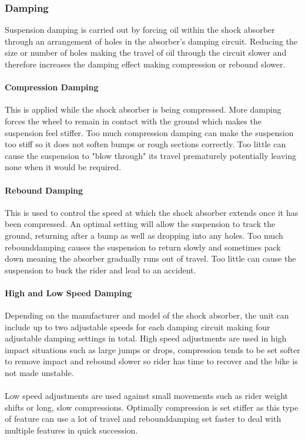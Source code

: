 	\subsubsection{Damping}
		Suspension damping is carried out by forcing oil within the shock absorber through an arrangement of holes in the absorber's damping circuit. Reducing the size or number of holes making the travel of oil through the circuit slower and therefore increases the damping effect making compression or rebound slower.
	\paragraph{Compression Damping} 
		This is applied while the shock absorber is being compressed. More damping forces the wheel to remain in contact with the ground which makes the suspension feel stiffer. Too much compression damping can make the suspension too stiff so it does not soften bumps or rough sections correctly. Too little can cause the suspension to "blow through" its travel prematurely potentially leaving none when it would be required.
	\paragraph{Rebound Damping}
		This is used to control the speed at which the shock absorber extends once it has been compressed. An optimal setting will allow the suspension to track the ground, returning after a bump as well as dropping into any holes. Too much \gls{rebounddamping} causes the suspension to return slowly and sometimes pack down meaning the absorber gradually runs out of travel. Too little can cause the suspension to buck the rider and lead to an accident.
	\paragraph{High and Low Speed Damping} 
		Depending on the manufacturer and model of the shock absorber, the unit can include up to two adjustable speeds for each damping circuit making four adjustable damping settings in total. High speed adjustments are used in high impact situations such as large jumps or drops, compression tends to be set softer to remove impact and rebound slower so rider has time to recover and the bike is not made unstable.
		\\\\
		Low speed adjustments are used against small movements such as rider weight shifts or long, slow compressions. Optimally compression is set stiffer as this type of feature can use a lot of travel and \gls{rebounddamping} set faster to deal with multiple features in quick succession.
